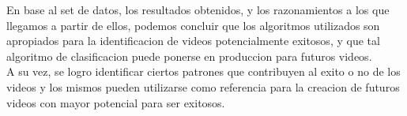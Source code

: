 En base al set de datos, los resultados obtenidos, y los razonamientos a los que
llegamos a partir de ellos, podemos concluir que los algoritmos utilizados son
apropiados para la identificacion de videos potencialmente exitosos, y que tal
algoritmo de clasificacion puede ponerse en produccion para futuros videos.\\
A su vez, se logro identificar ciertos patrones que contribuyen al exito o no
de los videos y los mismos pueden utilizarse como referencia para la creacion de
futuros videos con mayor potencial para ser exitosos.